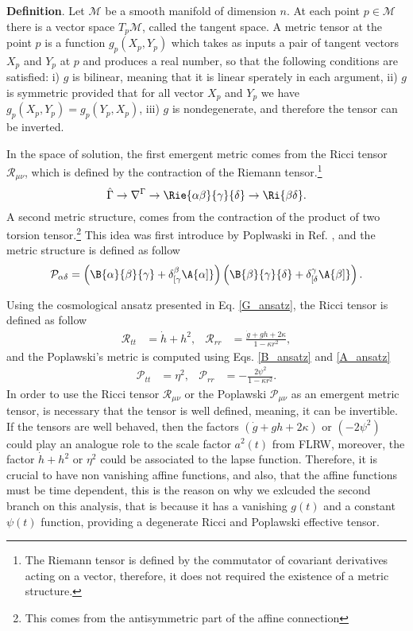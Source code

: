 \textbf{Definition}. Let $\mathcal{M}$ be a smooth manifold of dimension $n$. At each
point $p \in \mathcal{M}$ there is a vector space $T_p\mathcal{M}$, called the tangent
space. A metric tensor at the point $p$ is a function $g_p (X_p, Y_p)$ which takes as 
inputs a pair of tangent vectors $X_p$ and $Y_p$ at $p$ and produces a real number, 
so that the following conditions are satisfied: i) $g$ is bilinear, meaning that it is
linear sperately in each argument, ii) $g$ is symmetric provided that for all vector $X_p$ and
$Y_p$ we have $g_p(X_p, Y_p) = g_p (Y_p, X_p)$, iii) $g$ is nondegenerate, and therefore the
tensor can be inverted.

In the space of solution, the first emergent metric comes from the Ricci tensor $\mathcal{R}_{\mu\nu}$, which is 
defined by the contraction of the Riemann tensor.\footnote{The Riemann tensor is defined 
by the commutator of covariant derivatives acting on a vector, therefore, it does not 
required the existence of a metric structure.} 
\begin{equation}
    \label{chain}
    \hat{\Gamma} \to \nabla^{\Gamma} \to \Rie{\alpha\beta}{\gamma}{\delta} \to \Ri{\beta\delta}.
\end{equation}
A second metric structure, comes from the contraction of the product of two torsion 
tensor.\footnote{This comes from the antisymmetric part of the affine connection} 
This idea was first introduce by Poplwaski in Ref. \cite{Pop_awski_2013}, and the metric 
structure is defined as follow
\begin{equation}
    \mathcal{P}_{\alpha\delta} = \left(\B{\alpha}{\beta}{\gamma} + \delta^{\beta}_{[\gamma}\A{\alpha]}\right)\left(\B{\beta}{\gamma}{\delta} + \delta^{\gamma}_{[\delta}\A{\beta]}\right).
\end{equation}

Using the cosmological ansatz presented in Eq. \eqref{G_ansatz}, the Ricci tensor is 
defined as follow
\begin{align}
    \label{Ricci_tensor}
    \mathcal{R}_{tt} & = \dot{h} + h^2, & \mathcal{R}_{rr} & = \frac{\dot{g} + gh + 2\kappa}{1 - \kappa r^2},
\end{align}
and the Poplawski's metric is computed using Eqs. \eqref{B_ansatz} and \eqref{A_ansatz}
\begin{align}
    \label{Pop_tensor}
    \mathcal{P}_{tt} & = \eta^2, & \mathcal{P}_{rr} & = -\frac{2\psi^2}{1 - \kappa r^2}.
\end{align}
In order to use the Ricci tensor $\mathcal{R}_{\mu\nu}$ or the Poplawski $\mathcal{P}_{\mu\nu}$ as an
emergent metric tensor, is necessary that the tensor is well defined, meaning, it can be invertible. If the
tensors are well behaved, then the factors $\left(\dot{g} + gh + 2\kappa\right)$ or $\left(-2\psi^2\right)$ 
could play an analogue role to the scale factor $a^2(t)$ from FLRW, moreover, the factor 
$\dot{h} + h^2$ or $\eta^2$ could be associated to the lapse function. Therefore, it is crucial
to have non vanishing affine functions, and also, that the affine functions must be time
dependent, this is the reason on why we exlcuded the second branch on this analysis, that is
because it has a vanishing $g(t)$ and a constant $\psi(t)$ function, providing a degenerate
Ricci and Poplawski effective tensor.

